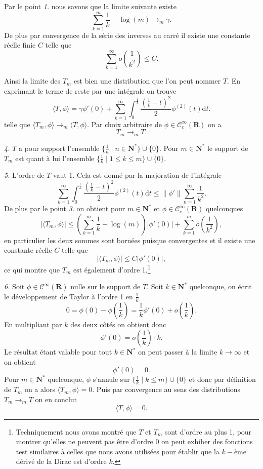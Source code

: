 \documentclass[12pt]{article}
\newcommand{\R}{\mathbf{R}}
\newcommand{\N}{\mathbf{N}}
\newcommand{\de}{\mathrm{d}}
\begin{document}
Par le point \textit{1.} nous savons que la limite suivante existe \[
\sum_{k=1}^{m}\frac{1}{k} - \log(m) \to_{m} \gamma
.\] De plus par convergence de la série des inverses au carré il existe une constante réelle finie $C$ telle que \[
\sum_{k=1}^{\infty} o(\frac{1}{k^{2}}) \le C 
.\]

Ainsi la limite des $T_{m}$ est bien une distribution que l'on peut nommer $T$. En exprimant le terme de reste par une intégrale on trouve 
\[
        \boxed{\langle T, \phi \rangle = \gamma\phi'(0) + \sum_{k=1}^{\infty} \int_{0}^{\frac{1}{k}}\frac{(\frac{1}{k}-t)^{2}}{2}\phi^{(2)}(t)\de t.}
\] 
 telle que $\langle T_{m}, \phi \rangle \to_{m} \langle T, \phi \rangle$. Par choix arbitraire de $\phi \in \mathcal{C}^{\infty}_{c}(\R)$ on a \[
T_{m} \to_{m} T
.\] 

\bigskip

\textit{4.} $T$ a pour support l'ensemble $\{\frac{1}{n} \;|\; n \in \N^{*}\} \cup \{0\} $. Pour $m \in \N^{*}$ le support de $T_{m}$ est quant à lui l'ensemble $\{\frac{1}{k} \;|\; 1\le k \le m\} \cup \{0\}$. 
\medskip

\textit{5.} L'ordre de $T$ vaut 1. Cela est donné par la majoration de l'intégrale \[
        \boxed{\sum_{k=1}^{\infty} \int_{0}^{\frac{1}{k}}\frac{(\frac{1}{k}-t)^{2}}{2}\phi^{(2)}(t)\de t \le \|\phi'\|\sum_{n=1}^{\infty} \frac{1}{k^{2}}.} 
\]  De plus par le point \textit{3.} on obtient pour $m \in \N^{*}$ et $\phi \in \mathcal{C}_{c}^{\infty}(\R)$ quelconques \[
|\langle T_{m}, \phi \rangle| \le (\sum_{k=1}^{m} \frac{1}{k} - \log(m))|\phi'(0)| + \sum_{k=1}^{m} o(\frac{1}{k^{2}})
,\] en particulier les deux sommes sont bornées puisque convergentes et il existe une constante réelle $C$ telle que \[
\boxed{|\langle T_{m}, \phi \rangle| \le C|\phi'(0)|,}
\] ce qui montre que $T_{m}$ est également d'ordre 1.\footnote{Techniquement nous avons montré que $T$ et $T_{m}$ sont d'ordre au plus 1, pour montrer qu'elles ne peuvent pas être d'ordre 0 on peut exhiber des fonctions test similaires à celles que nous avons utilisées pour établir que la $k-$ème dérivé de la Dirac est d'ordre $k$.} 

\bigskip

\textit{6.} Soit $\phi \in \mathcal{C}^{\infty}(\R)$ nulle sur le support de $T$. Soit $k \in \N^{*}$ quelconque, on écrit le développement de Taylor à l'ordre 1 en $\frac{1}{k}$
\[
        0 = \phi(0) - \phi(\frac{1}{k}) = \frac{1}{k}\phi'(0) + o(\frac{1}{k})
.\] En multipliant par $k$ des deux côtés on obtient donc  \[
\phi'(0) = o(\frac{1}{k})\cdot k
.\] Le résultat étant valable pour tout $k \in \N^{*}$ on peut passer à la limite $k \to \infty$ et on obtient  \[
\phi'(0) = 0
.\] Pour $m \in \N^{*}$ quelconque, $\phi$ s'annule sur $\{\frac{1}{k} \;|\; k \le m\} \cup \{0\}$ et donc par définition de $T_{m}$ on a alors $\langle T_{m}, \phi \rangle = 0$. Puis par convergence au sens des distributions $T_{m} \to_{m} T$ on en conclut \[
\boxed{\langle T, \phi \rangle = 0.}
\]  
\end{document}
